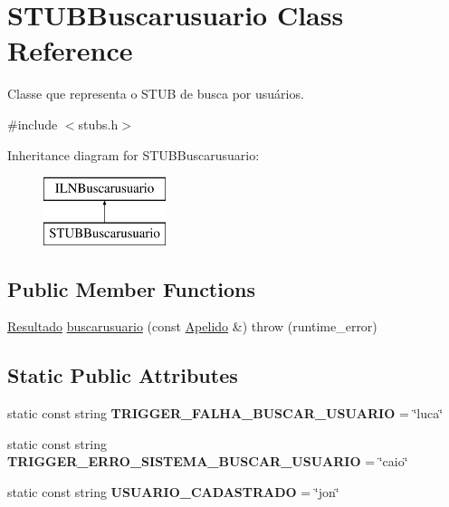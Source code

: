 \hypertarget{classSTUBBuscarusuario}{}\section{S\+T\+U\+B\+Buscarusuario Class Reference}
\label{classSTUBBuscarusuario}


Classe que representa o S\+T\+UB de busca por usuários.  




{\ttfamily \#include $<$stubs.\+h$>$}

Inheritance diagram for S\+T\+U\+B\+Buscarusuario\+:\begin{figure}[H]
\begin{center}
\leavevmode
\includegraphics[height=2.000000cm]{classSTUBBuscarusuario}
\end{center}
\end{figure}
\subsection*{Public Member Functions}
\begin{DoxyCompactItemize}
\item 
\hyperlink{classResultado}{Resultado} \hyperlink{classSTUBBuscarusuario_a141fd191173b121439e480f32318aa14}{buscarusuario} (const \hyperlink{classApelido}{Apelido} \&)  throw (runtime\+\_\+error)
\end{DoxyCompactItemize}
\subsection*{Static Public Attributes}
\begin{DoxyCompactItemize}
\item 
\mbox{\label{classSTUBBuscarusuario_a47c8339e9b3576007afa98a8be1e5ec8}} 
static const string {\bfseries T\+R\+I\+G\+G\+E\+R\+\_\+\+F\+A\+L\+H\+A\+\_\+\+B\+U\+S\+C\+A\+R\+\_\+\+U\+S\+U\+A\+R\+IO} = \char`\"{}luca\char`\"{}
\item 
\mbox{\label{classSTUBBuscarusuario_a7e000fa79422cdd12702bd3e7463d129}} 
static const string {\bfseries T\+R\+I\+G\+G\+E\+R\+\_\+\+E\+R\+R\+O\+\_\+\+S\+I\+S\+T\+E\+M\+A\+\_\+\+B\+U\+S\+C\+A\+R\+\_\+\+U\+S\+U\+A\+R\+IO} = \char`\"{}caio\char`\"{}
\item 
\mbox{\label{classSTUBBuscarusuario_ac1b3a0f4334da571cb8cb89b2ad57643}} 
static const string {\bfseries U\+S\+U\+A\+R\+I\+O\+\_\+\+C\+A\+D\+A\+S\+T\+R\+A\+DO} = \char`\"{}jon\char`\"{}
\end{DoxyCompactItemize}


